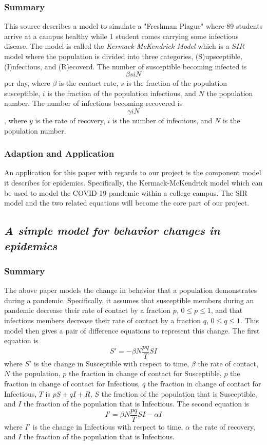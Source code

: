 \documentclass{article}
\begin{document}
\subsubsection{Summary}
This source describes a model to simulate a "Freshman Plague" where 89 students arrive at a campus healthy while 1 student comes carrying some infectious disease.
The model is called the \textit{Kermack-McKendrick Model} which is a $SIR$ model where the population is divided into three categories, (S)upsceptible, (I)nfectious, and (R)ecoverd. The number of susceptible becoming infected is \[\beta siN\] per day, where $\beta$ is the contact rate, $s$ is the fraction of the population susceptible, $i$ is the fraction of the population infectious, and $N$ the population number. The number of infectious becoming recovered is \[\gamma iN\], where $y$ is the rate of recovery, $i$ is the number of infectious, and $N$ is the population number.
\cite{python}
\subsubsection{Adaption and Application}
An application for this paper with regards to our project is the component model it describes for epidemics. Specifically, the Kermack-McKendrick model which can be used to model the COVID-19 pandemic within a college campus. The SIR model and the two related equations will become the core part of our project.

\subsection{\textit{A simple model for behavior changes in epidemics}}
\subsubsection{Summary}
The above paper models the change in behavior that a population demonstrates during a pandemic. Specifically, it assumes that susceptible members during an pandemic decrease their rate of contact by a fraction $p$, $0 \le  p \le 1$, and that infectious members decrease their rate of contact by a fraction $q$, $0 \le q \le 1$. This model then gives a pair of difference equations to represent this change.
The first equation is \[S' = -\beta N\frac{pq}{T}SI\] where $S'$ is the change in Susceptible with respect to time, $\beta$ the rate of contact, $N$ the population, $p$ the fraction in change of contact for Susceptible, $p$ the fraction in change of contact for Infectious, $q$ the fraction in change of contact for Infectious, $T$ is $pS + qI + R$, $S$ the fraction of the population that is Susceptible, and $I$ the fraction of the population that is Infectious. 
The second equation is \[I' = \beta N \frac{pq}{T}SI-\alpha I\] where $I'$ is the change in Infectious with respect to time, $\alpha$ the rate of recovery, and $I$ the fraction of the population that is Infectious.
\cite{behavior}
\end{document}
